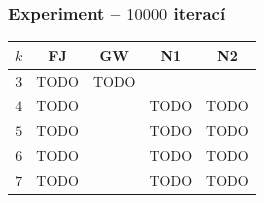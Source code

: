 \subsubsection*{Experiment -- $10000$ iterací}
\begin{center}
    \begin{tabular}{ c c c c c }
    $k$ & FJ         & GW                  & N1                  & N2          \\
    \hline
    $3$ & TODO       & TODO                &                     &            \\  
    $4$ & TODO       &                     & TODO                & TODO       \\
    $5$ & TODO       &                     & TODO                & TODO       \\
    $6$ & TODO       &                     & TODO                & TODO       \\
    $7$ & TODO       &                     & TODO                & TODO       \\
    \end{tabular}
\end{center}
